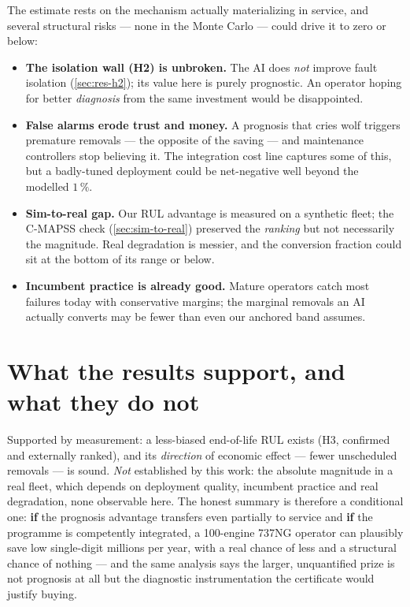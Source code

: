 The estimate rests on the mechanism actually materializing in service, and several structural
risks --- none in the Monte Carlo --- could drive it to zero or below:
\begin{itemize}
  \item \textbf{The isolation wall (H2) is unbroken.} The AI does \emph{not} improve fault
    isolation (\cref{sec:res-h2}); its value here is purely prognostic. An operator hoping
    for better \emph{diagnosis} from the same investment would be disappointed.
  \item \textbf{False alarms erode trust and money.} A prognosis that cries wolf triggers
    premature removals --- the opposite of the saving --- and maintenance controllers stop
    believing it. The integration cost line captures some of this, but a badly-tuned
    deployment could be net-negative well beyond the modelled $1\,\%$.
  \item \textbf{Sim-to-real gap.} Our RUL advantage is measured on a synthetic fleet; the
    C-MAPSS check (\cref{sec:sim-to-real}) preserved the \emph{ranking} but not necessarily
    the magnitude. Real degradation is messier, and the conversion fraction could sit at the
    bottom of its range or below.
  \item \textbf{Incumbent practice is already good.} Mature operators catch most failures
    today with conservative margins; the marginal removals an AI actually converts may be
    fewer than even our anchored band assumes.
\end{itemize}

\section{What the results support, and what they do not}
\label{sec:econ-support}

Supported by measurement: a less-biased end-of-life RUL exists (H3, confirmed and externally
ranked), and its \emph{direction} of economic effect --- fewer unscheduled removals --- is
sound. \emph{Not} established by this work: the absolute magnitude in a real fleet, which
depends on deployment quality, incumbent practice and real degradation, none observable here.
The honest summary is therefore a conditional one: \textbf{if} the prognosis advantage
transfers even partially to service and \textbf{if} the programme is competently integrated,
a 100-engine 737NG operator can plausibly save low single-digit millions per year, with a
real chance of less and a structural chance of nothing --- and the same analysis says the
larger, unquantified prize is not prognosis at all but the diagnostic instrumentation the
certificate would justify buying.
